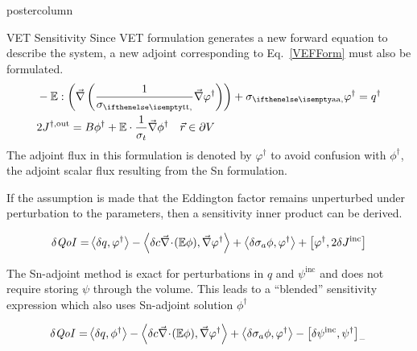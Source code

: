 \documentclass[xcolor={usenames,dvipsnames,svgnames,table}]{beamer}
\newcommand{\vr}{\vec{r}}
\newcommand{\bra}{\left\langle}
\newcommand{\ket}{\right\rangle}
\newcommand{\sbra}{\left[}
\newcommand{\sket}{\right]}
\newcommand{\bound}{\partial V}
\newcommand{\Edd}{\mathbb{E}}
\newcommand{\isigt}{c}
\newcommand{\scalResp}{q^\dag}
\newcommand{\qoi}{{\it QoI}\xspace}
\begin{document}
\begin{frame}
\begin{columns}
\begin{column}{.33\textwidth}
\begin{beamercolorbox}[center,wd=\textwidth]{postercolumn}
\begin{minipage}[T]{0.95\textwidth}
{			    %
			    \begin{block}{VET Sensitivity}
Since VET formulation generates a new forward equation to describe the system, a new adjoint corresponding to Eq.~\eqref{VEFForm} must also be formulated. 
\begin{equation}
\label{adjForm}
\begin{split}
&- \Edd : \left( \grad \left( \frac{1}{\sigt}\grad \varphi^\dag \right) \right) + \siga \varphi^\dag = \scalResp\\
&2J^{\dag,\text{out}} = B \phi^\dag + 
\Edd \cdot \frac{1}{\sigma_{t} } \vec{\nabla} \phi^\dag   \quad \vr \in \bound
\end{split}
\end{equation}
The adjoint flux in this formulation is denoted by $\varphi^\dag$ to avoid confusion with $\phi^\dag$, the adjoint scalar flux resulting from the Sn formulation.

If the assumption is made that the Eddington factor remains unperturbed under perturbation to the parameters, then a sensitivity inner product can be derived.


\begin{equation}
\label{SensIP1}
\begin{split}
\delta \qoi =&  \bra \delta q , \varphi^\dag \ket - \bra \delta \isigt \div (\Edd \phi), \grad \varphi^\dag \ket + \bra \delta \sigma_a \phi, \varphi^\dag \ket + \sbra \varphi^\dag, 2 \delta J^{\text{inc}} \sket \\
\end{split}
\end{equation}

The Sn-adjoint method is exact for perturbations in $q$ and $\psi^\text{inc}$ and does not require storing $\psi$ through the volume. This leads to a ``blended'' sensitivity expression which also uses Sn-adjoint solution $\phi^\dag$

\begin{equation}
\label{SensIP2}
\begin{split}
\delta \qoi =&  \bra \delta q , \phi^\dag \ket - \bra \delta \isigt \div (\Edd \phi), \grad \varphi^\dag \ket + \bra \delta \sigma_a \phi, \varphi^\dag \ket \\
\end{split} - \sbra \delta \psi^{\text{inc}}, \psi^\dag \sket_- \,
\end{equation}



\end{block}}
\end{minipage}
\end{beamercolorbox}
\end{column}
\end{columns}
\end{frame}
\end{document}
